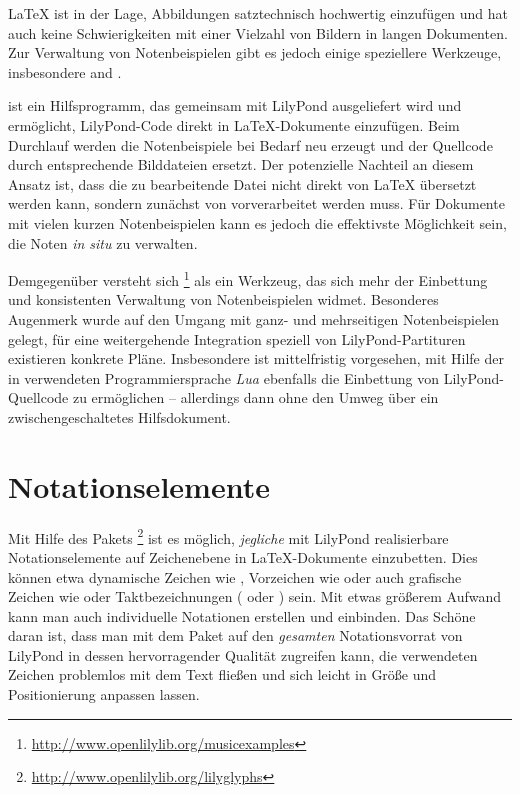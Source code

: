 \documentclass[DIV=12]{scrreprt}
\begin{document}
\LaTeX{} ist in der Lage, Abbildungen satztechnisch hochwertig einzufügen und hat auch keine Schwierigkeiten mit einer Vielzahl von Bildern in langen Dokumenten.
Zur Verwaltung von Notenbeispielen gibt es jedoch einige speziellere Werkzeuge, insbesondere  and .

 ist ein Hilfsprogramm, das gemeinsam mit LilyPond ausgeliefert wird und ermöglicht, LilyPond-Code direkt in \LaTeX-Dokumente einzufügen.
Beim Durchlauf werden die Notenbeispiele bei Bedarf neu erzeugt und der Quellcode durch entsprechende Bilddateien ersetzt.
Der potenzielle Nachteil an diesem Ansatz ist, dass die zu bearbeitende Datei nicht direkt von \LaTeX{} übersetzt werden kann, sondern zunächst von  vorverarbeitet werden muss.
Für Dokumente mit vielen kurzen Notenbeispielen kann es jedoch die effektivste Möglichkeit sein, die Noten \emph{in situ} zu verwalten.

Demgegenüber versteht sich %
\footnote{\url{http://www.openlilylib.org/musicexamples}} 
als ein Werkzeug, das sich mehr der Einbettung und konsistenten Verwaltung von Notenbeispielen widmet.
Besonderes Augenmerk wurde auf den Umgang mit ganz- und mehrseitigen Notenbeispielen gelegt, für eine weitergehende Integration speziell von LilyPond-Partituren existieren konkrete Pläne.
Insbesondere ist mittelfristig vorgesehen, mit Hilfe der in  verwendeten Programmiersprache \emph{Lua} ebenfalls die Einbettung von LilyPond-Quellcode zu ermöglichen -- allerdings dann ohne den Umweg über ein zwischengeschaltetes Hilfsdokument.

\section{Notationselemente}
\label{sec:pt_notational-elements}
Mit Hilfe des Pakets \lilyglyphs%
\footnote{\url{http://www.openlilylib.org/lilyglyphs}}
ist es möglich, \emph{jegliche} mit LilyPond realisierbare Notationselemente auf Zeichenebene in \LaTeX-Dokumente einzubetten.
Dies können etwa dynamische Zeichen wie , Vorzeichen wie \flatflat{} oder auch grafische Zeichen wie \crescHairpin{} oder Taktbezeichnungen ( oder \lilyTimeCHalf) sein.
Mit etwas größerem Aufwand kann man auch individuelle Notationen erstellen und einbinden.
Das Schöne daran ist, dass man mit dem Paket auf den \emph{gesamten} Notationsvorrat von LilyPond in dessen hervorragender Qualität zugreifen kann, die verwendeten Zeichen problemlos mit dem Text fließen und sich leicht in Größe und Positionierung anpassen lassen.
\end{document}
